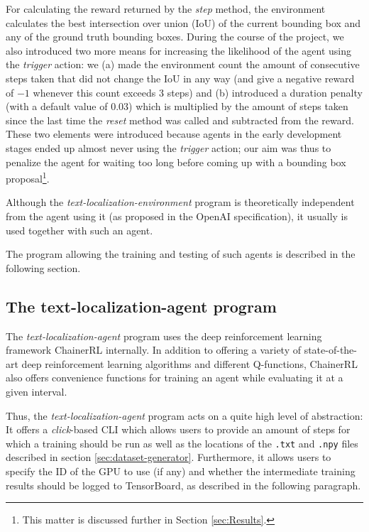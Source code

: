 For calculating the reward returned by the \textit{step} method, the environment calculates the best intersection over union (IoU) of the current bounding box and any of the ground truth bounding boxes. 
During the course of the project, we also introduced two more means for increasing the likelihood of the agent using the \textit{trigger} action: we (a) made the environment count the amount of consecutive steps taken that did not change the IoU in any way (and give a negative reward of $-1$ whenever this count exceeds 3 steps) and (b) introduced a duration penalty (with a default value of $0.03$) which is multiplied by the amount of steps taken since the last time the \textit{reset} method was called and subtracted from the reward. These two elements were introduced because agents in the early development stages ended up almost never using the \textit{trigger} action; our aim was thus to penalize the agent for waiting too long before coming up with a bounding box proposal\footnote{This matter is discussed further in Section \ref{sec:Results}.}.

Although the \textit{text-localization-environment} program is theoretically independent from the agent using it (as proposed in the OpenAI specification), it usually is used together with such an agent.

The program allowing the training and testing of such agents is described in the following section.

\subsection{The text-localization-agent program}

The \textit{text-localization-agent} program uses the deep reinforcement learning framework ChainerRL\cite{ChainerRL} internally.
In addition to offering a variety of state-of-the-art deep reinforcement learning algorithms and different Q-functions, ChainerRL also offers convenience functions for training an agent while evaluating it at a given interval.

Thus, the \textit{text-localization-agent} program acts on a quite high level of abstraction:
It offers a \textit{click}-based CLI which allows users to provide an amount of steps for which a training should be run as well as the locations of the \texttt{.txt} and \texttt{.npy} files described in section \ref{sec:dataset-generator}. 
Furthermore, it allows users to specify the ID of the GPU to use (if any) and whether the intermediate training results should be logged to TensorBoard, as described in the following paragraph.


